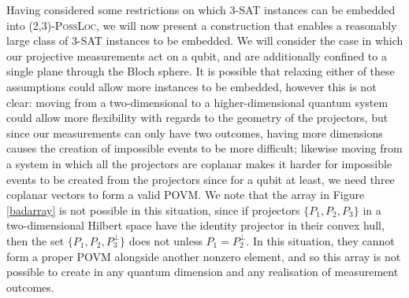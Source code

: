 \documentclass[reprint]{revtex4-1}
\theoremstyle{definition}
\begin{document}
Having considered some restrictions on which \textsc{3-SAT} instances can be embedded into \textsc{(2,3)-PossLoc}, we will now present a construction that enables a reasonably large class of \textsc{3-SAT} instances to be embedded. We will consider the case in which our projective measurements act on a qubit, and are additionally confined to a single plane through the Bloch sphere. It is possible that relaxing either of these assumptions could allow more instances to be embedded, however this is not clear: moving from a two-dimensional to a higher-dimensional quantum system could allow more flexibility with regards to the geometry of the projectors, but since our measurements can only have two outcomes, having more dimensions causes the creation of impossible events to be more difficult; likewise moving from a system in which all the projectors are coplanar makes it harder for impossible events to be created from the projectors since for a qubit at least, we need three coplanar vectors to form a valid POVM. 
We note that the array in Figure \ref{badarray} is not possible in this situation, since if projectors $\{P_1,P_2,P_3\}$ in a two-dimensional Hilbert space have the identity projector in their convex hull, then the set $\{P_1,P_2, P_3^\perp\}$ does not unless $P_1=P_2^\perp$. In this situation, they cannot form a proper POVM alongside another nonzero element, and so this array is not possible to create in any quantum dimension and any realisation of measurement outcomes.
\end{document}
